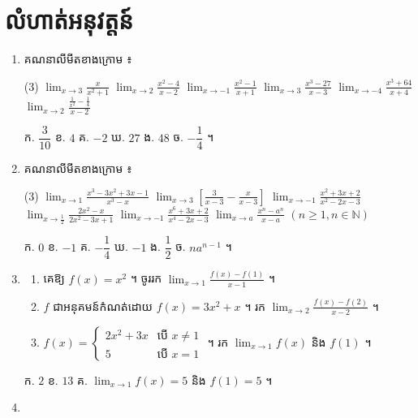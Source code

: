\section*{លំហាត់អនុវត្តន៍}
\begin{enumerate}[1]
  \item គណនាលីមីតខាងក្រោម ៖
  \begin{tasks}(3)
    \task $\displaystyle\lim_{x \to 3}\frac{x}{x^2 + 1}$
    \task $\displaystyle\lim_{x \to 2}\frac{x^2 - 4}{x - 2}$
    \task $\displaystyle\lim_{x \to -1}\frac{x^2 - 1}{x + 1}$
    \task $\displaystyle\lim_{x \to 3}\frac{x^3 - 27}{x - 3}$
    \task $\displaystyle\lim_{x \to -4}\frac{x^3 + 64}{x + 4}$
    \task $\displaystyle\lim_{x \to 2}\frac{\frac{1}{x^2} - \frac{1}{4}}{x - 2}$
  \end{tasks}
  \ans
  ក. $\dfrac{3}{10}$ \quad ខ. $4$ \quad គ. $-2$ \quad ឃ. $27$ \quad ង. $48$ \quad ច. $-\dfrac{1}{4}$ ។
  \item គណនាលីមីតខាងក្រោម ៖
  \begin{tasks}(3)
    \task $\displaystyle\lim_{x \to 1}\frac{x^3 - 3x^2 + 3x - 1}{x^3 - x}$
    \task $\displaystyle\lim_{x \to 3}\left[\frac{3}{x - 3} - \frac{x}{x - 3}\right]$
    \task $\displaystyle\lim_{x \to -1}\frac{x^2 + 3x + 2}{x^2 - 2x - 3}$
    \task $\displaystyle\lim_{x \to \frac{1}{2}}\frac{2x^2 - x}{2x^2 - 3x + 1}$
    \task $\displaystyle\lim_{x \to -1}\frac{x^6 + 3x + 2}{x^4 - 2x - 3}$
    \task $\displaystyle\lim_{x \to a}\frac{x^n - a^n}{x - a}$ $(n \ge 1, n \in \mathbb{N})$
  \end{tasks}
  \ans
  ក. $0$ \quad ខ. $-1$ \quad គ. $-\dfrac{1}{4}$ \quad ឃ. $-1$ \quad ង. $\dfrac{1}{2}$ \quad ច. $na^{n-1}$ ។
  \item \begin{enumerate}[a]
    \item គេឱ្យ $f(x) = x^2$ ។ ចូររក $\displaystyle\lim_{x \to 1}\frac{f(x) - f(1)}{x - 1}$ ។
    \item $f$ ជាអនុគមន៍កំណត់ដោយ $f(x) = 3x^2 + x$ ។ រក $\displaystyle\lim_{x \to 2}\frac{f(x) - f(2)}{x - 2}$ ។
    \item $f(x) = \begin{cases} 2x^2 + 3x & \text{បើ } x \ne 1\\ 5 & \text{បើ } x = 1 \end{cases}$ ។ រក $\displaystyle\lim_{x \to 1} f(x)$ និង $f(1)$ ។
  \end{enumerate}
  \ans
  ក. $2$ \quad ខ. $13$ \quad គ. $\displaystyle\lim_{x \to 1} f(x) = 5$ និង $f(1) = 5$ ។
  \item \begin{enumerate}[a]

\end{enumerate}
\end{enumerate}
